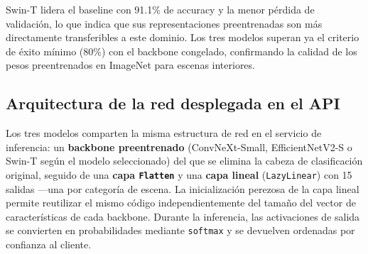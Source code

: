 Swin-T lidera el baseline con 91.1\% de accuracy y la menor pérdida de validación, lo que indica que sus representaciones preentrenadas son más directamente transferibles a este dominio. Los tres modelos superan ya el criterio de éxito mínimo (80\%) con el backbone congelado, confirmando la calidad de los pesos preentrenados en ImageNet para escenas interiores.

\subsection{Arquitectura de la red desplegada en el API}

Los tres modelos comparten la misma estructura de red en el servicio de inferencia: un \textbf{backbone preentrenado} (ConvNeXt-Small, EfficientNetV2-S o Swin-T según el modelo seleccionado) del que se elimina la cabeza de clasificación original, seguido de una \textbf{capa \texttt{Flatten}} y una \textbf{capa lineal} (\texttt{LazyLinear}) con 15 salidas —una por categoría de escena. La inicialización perezosa de la capa lineal permite reutilizar el mismo código independientemente del tamaño del vector de características de cada backbone. Durante la inferencia, las activaciones de salida se convierten en probabilidades mediante \texttt{softmax} y se devuelven ordenadas por confianza al cliente.
